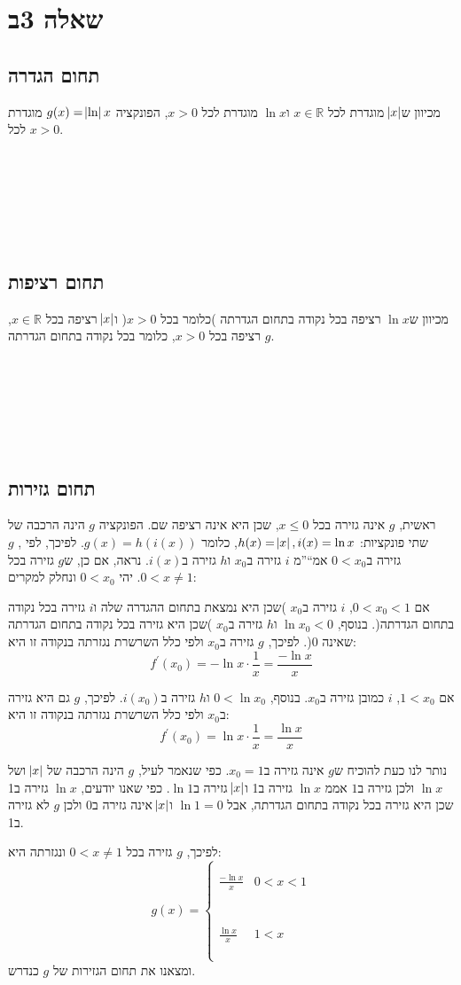 \documentclass[11pt, oneside]{article}
\newcommand{\qed}{\R{$\blacksquare$}}
\newcommand{\br}{\\\\\\\\\\\\\\}
\newcommand{\mR}{\mathbb{R}}
\newcommand{\m}[3]{\R{משפט #3#2.#1}}
\begin{document}
\section*{שאלה 3ב}
\subsection*{תחום הגדרה}
מכיוון ש$\abs{x}$ מוגדרת לכל $x \in \mR$ ו$\ln{x}$ מוגדרת לכל $x > 0$, הפונקציה $g(x) = \abs\ln{x}$ מוגדרת לכל $x > 0$.
\br\qed
\subsection*{תחום רציפות}
מכיוון ש$\ln{x}$ רציפה בכל נקודה בתחום הגדרתה )כלומר בכל $x > 0$( ו$\abs{x}$ רציפה בכל $x \in \mR$, $g$ רציפה בכל $x > 0$, כלומר בכל נקודה בתחום הגדרתה.
\br\qed
\subsection*{תחום גזירות}
ראשית, $g$ אינה גזירה בכל $x \le 0$, שכן היא אינה רציפה שם. הפונקציה $g$ הינה הרכבה של שתי פונקציות: $h(x) = \abs{x}, i(x) = \ln{x}$, כלומר $g(x) = h(i(x))$. לפיכך, לפי \m{7}{12}{}, $g$ גזירה ב$0 < x_{0}$ אמ``''מ $i$ גזירה ב$x_{0}$ ו$h$ גזירה ב$i(x)$. נראה, אם כן, ש$g$ גזירה בכל $0 < x \neq 1$. יהי $0 < x_{0}$ ונחלק למקרים:

אם $0 < x_{0} < 1$, $i$ גזירה ב$x_{0}$ )שכן היא נמצאת בתחום ההגדרה שלה ו$i$ גזירה בכל נקודה בתחום הגדרתה(. בנוסף, $\ln{x_{0}} < 0$ ו$h$ גזירה ב$x_{0}$ )שכן היא גזירה בכל נקודה בתחום הגדרתה שאינה 0(. לפיכך, $g$ גזירה ב$x_{0}$ ולפי כלל השרשרת נגזרתה בנקודה זו היא:
\[
f^{\prime}(x_{0}) = -\ln{x} \cdot \frac{1}{x} = \frac{-\ln{x}}{x}
\]

אם $1 < x_{0}$, $i$ כמובן גזירה ב$x_{0}$. בנוסף, $0 < \ln{x_{0}}$ ו$h$ גזירה ב$i(x_{0})$. לפיכך, $g$ גם היא גזירה ב$x_{0}$ ולפי כלל השרשרת נגזרתה בנקודה זו היא:
\[
f^{\prime}(x_{0}) = \ln{x} \cdot \frac{1}{x} = \frac{\ln{x}}{x}
\]

נותר לנו כעת להוכיח ש$g$ אינה גזירה ב$x_{0} = 1$. כפי שנאמר לעיל, $g$ הינה הרכבה של $\abs{x} $ ושל $\ln{x}$ ולכן גזירה ב$1$ אממ $\ln{x}$ גזירה ב1 ו$\abs{x}$ גזירה ב$\ln{1}$. כפי שאנו יודעים, $\ln{x}$ גזירה ב1 שכן היא גזירה בכל נקודה בתחום הגדרתה, אבל $\ln{1} = 0$ ו$\abs{x}$ אינה גזירה ב0 ולכן $g$ לא גזירה ב1.

לפיכך, $g$ גזירה בכל $0 < x \neq 1$ ונגזרתה היא:
\[
g(x) = \begin{cases}\\\\
\frac{-\ln{x}}{x} & 0 < x < 1\br
\frac{\ln{x}}{x} & 1 < x\\\\\\
\end{cases}
\]
ומצאנו את תחום הגזירות של $g$ כנדרש.
\br\qed
\clearpage
\end{document}
